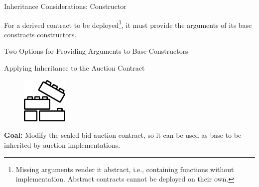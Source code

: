 \documentclass[]{beamer}
\begin{document}
\begin{frame}{Inheritance Considerations: Constructor}

For a derived contract to be deployed\footnote{Missing arguments render it abstract, i.e., containing functions without implementation. Abstract contracts cannot be deployed on their own.}, it must provide the arguments of its base constracts constructors.

\vspace{-0.5em}

\begin{samplecode}{Two Options for Providing Arguments to Base Constructors}
	
\end{samplecode}


\end{frame}


\begin{frame}{Applying Inheritance to the Auction Contract}

\begin{minipage}{0.3\textwidth}
	\begin{figure}
		\center
		\includegraphics[width= 2.2cm]{../assets/images/construction.png}	
	\end{figure}
\end{minipage}
\begin{minipage}{0.65\textwidth}
	\textbf{Goal:} Modify the sealed bid auction contract, so it can be used as base to be inherited by auction implementations.\\
\end{minipage}

\vspace{3em}


\end{frame}
\end{document}
